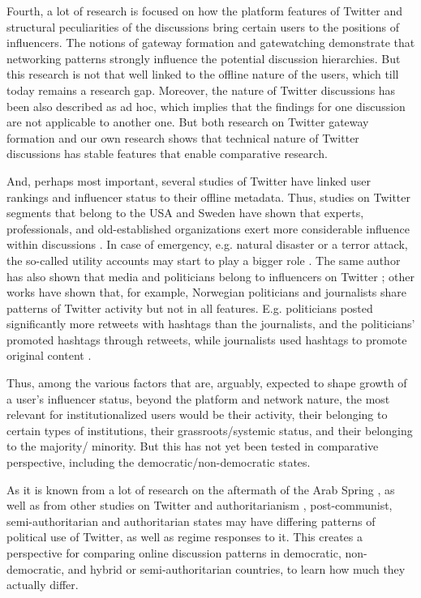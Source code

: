 Fourth, a lot of research is focused on how the platform features of Twitter and structural peculiarities of the discussions bring certain users to the positions of influencers. The notions of gateway formation \cite{BastosRaimundoTravitzki} and gatewatching \cite{Bruns2011,Bruns2005} demonstrate that networking patterns strongly influence the potential discussion hierarchies. But this research is not that well linked to the offline nature of the users, which till today remains a research gap. Moreover, the nature of Twitter discussions has been also described as ad hoc, which implies that the findings for one discussion are not applicable to another one. But both research on Twitter gateway formation \cite{BastosRaimundoTravitzki} and our own research shows that technical nature of Twitter discussions has stable features that enable comparative research.

And, perhaps most important, several studies of Twitter have linked user rankings and influencer status to their offline metadata. Thus, studies on Twitter segments that belong to the USA and Sweden have shown that experts, professionals, and old-established organizations exert more considerable influence within discussions \cite{FoxZickuhrSmith,Ruth}. In case of emergency, e.g. natural disaster or a terror attack, the so-called utility accounts may start to play a bigger role \cite{Bruns2011}. The same author has also shown that media and politicians belong to influencers on Twitter \cite{Bruns2011}; other works have shown that, for example, Norwegian politicians and journalists share patterns of Twitter activity \cite{EnliSimonsen} but not in all features. E.g. politicians posted significantly more retweets with hashtags than the journalists, and the politicians’ promoted hashtags through retweets, while journalists used hashtags to promote original content \cite{EnliSimonsen}.

Thus, among the various factors that are, arguably, expected to shape growth of a user’s influencer status, beyond the platform and network nature, the most relevant for institutionalized users would be their activity, their belonging to certain types of institutions, their grassroots/systemic status, and their belonging to the majority/ minority. But this has not yet been tested in comparative perspective, including the democratic/non-democratic states.

As it is known from a lot of research on the aftermath of the Arab Spring \cite{Lynch,TufekciWilson}, as well as from other studies on Twitter and authoritarianism \cite{TufekciWilson,HowardAgarwalHussain}, post-communist, semi-authoritarian and authoritarian states may have differing patterns of political use of Twitter, as well as regime responses to it. This creates a perspective for comparing online discussion patterns in democratic, non-democratic, and hybrid or semi-authoritarian countries, to learn how much they actually differ.

